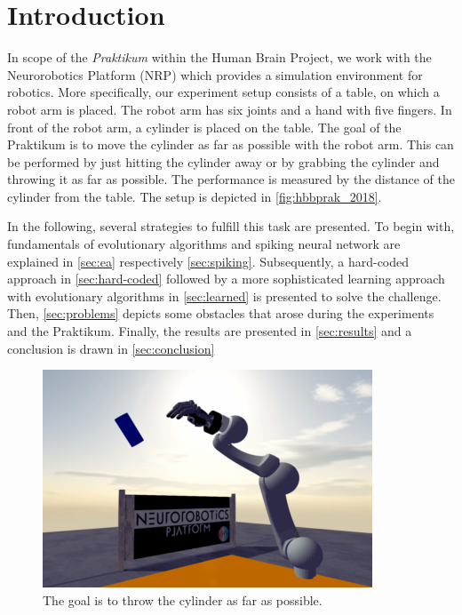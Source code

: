 \section{Introduction}
\label{sec:intro}
In scope of the \textit{Praktikum} within the Human Brain Project, we work with the Neurorobotics Platform (NRP) which provides a simulation environment for robotics.
More specifically, our experiment setup consists of a table, on which a robot arm is placed.
The robot arm has six joints and a hand with five fingers.
In front of the robot arm, a cylinder is placed on the table.
The goal of the Praktikum is to move the cylinder as far as possible with the robot arm.
This can be performed by just hitting the cylinder away or by grabbing the cylinder and throwing it as far as possible.
The performance is measured by the distance of the cylinder from the table.
The setup is depicted in \autoref{fig:hbbprak_2018}.

In the following, several strategies to fulfill this task are presented.
To begin with, fundamentals of evolutionary algorithms and spiking neural network are explained in \autoref{sec:ea} respectively \autoref{sec:spiking}.
Subsequently, a hard-coded approach in \autoref{sec:hard-coded} followed by a more sophisticated learning approach with evolutionary algorithms in \autoref{sec:learned} is presented to solve the challenge.
Then, \autoref{sec:problems} depicts some obstacles that arose during the experiments and the Praktikum.
Finally, the results are presented in \autoref{sec:results} and a conclusion is drawn in \autoref{sec:conclusion}

\begin{figure}[h]
\centering
\includegraphics[width=.95\columnwidth]{figures/hbpprak_2018.png}
\caption{The goal is to throw the cylinder as far as possible.}
\label{fig:hbbprak_2018}
\end{figure}